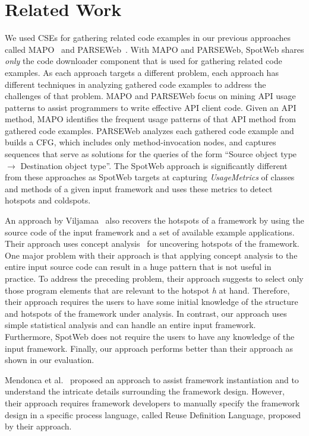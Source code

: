 \documentclass[conference]{IEEEtran}
\begin{document}
\section {Related Work}
\label{sec:related}
We used CSEs for gathering related code examples in our 
previous approaches called MAPO~\cite{mapo:xie} and PARSEWeb~\cite{thummalapenta07:parseweb}.
With MAPO and PARSEWeb, SpotWeb shares \emph{only} the code downloader component that is used for gathering
related code examples. As each approach targets
a different problem, each approach has different techniques 
in analyzing gathered code examples to address the
challenges of that problem. MAPO and PARSEWeb focus on mining
API usage patterns to assist programmers to write effective API client code.
Given an API method, MAPO identifies the frequent usage patterns of that API method from
gathered code examples. PARSEWeb analyzes each gathered code example and builds
a CFG, which includes only method-invocation nodes, and captures sequences
that serve as solutions for the queries of the form ``Source object type $\rightarrow$ Destination object type''.
The SpotWeb approach is significantly different from these approaches as SpotWeb targets at capturing
\emph{UsageMetrics} of classes and methods of a given input framework and uses
these metrics to detect hotspots and coldspots.

An approach by Viljamaa~\cite{viljamaa:reverse} also recovers the hotspots of a framework
by using the source code of the input framework and a set of available example applications. Their approach
uses concept analysis~\cite{ganter:concept} for uncovering hotspots of the framework. One major
problem with their approach is that applying concept analysis to the entire input source code
can result in a huge pattern that is not useful in practice. To
address the preceding problem, their approach 
suggests to select only those program elements 
that are relevant to the hotspot \emph{h} at hand. Therefore, their
approach requires the users to have some initial knowledge of the structure
and hotspots of the framework under analysis. In contrast,
our approach uses simple statistical analysis and can handle an entire input
framework. Furthermore, SpotWeb does not require
the users to have any knowledge of the input framework. Finally,
our approach performs better than their approach as shown in our evaluation.

Mendonca et al.~\cite{mendoca:instantiation} proposed an approach to
assist framework instantiation and to understand the intricate
details surrounding the framework design.
However, their approach requires framework developers to
manually specify the framework design in a specific process
language, called Reuse Definition Language, proposed by their approach.
\end{document}
